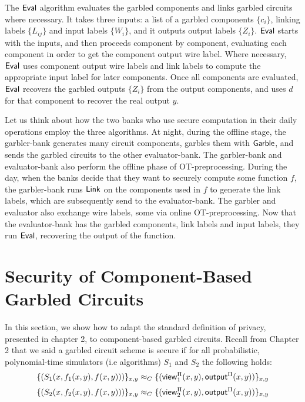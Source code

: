 The $\sf{Eval}$ algorithm evaluates the garbled components and links garbled circuits where necessary.
It takes three inputs: a list of a garbled components $\{c_i\}$, linking labels $\{L_{ij}\}$ and input labels $\{W_i\}$, and it outputs output labels $\{Z_i\}$. 
$\sf{Eval}$ starts with the inputs, and then proceeds component by component, evaluating each component in order to get the component output wire label.
Where necessary, $\sf{Eval}$ uses component output wire labels and link labels to compute the appropriate input label for later components. 
Once all components are evaluated, $\sf{Eval}$ recovers the garbled outputs $\{Z_i\}$ from the output components, and uses $d$ for that component to recover the real output $y$. 

Let us think about how the two banks who use secure computation in their daily operations employ the three algorithms.
At night, during the offline stage, the garbler-bank generates many circuit components, garbles them with $\sf{Garble}$, and sends the garbled circuits to the other evaluator-bank. 
The garbler-bank and evaluator-bank also perform the offline phase of OT-preprocessing.
During the day, when the banks decide that they want to securely compute some function $f$, the garbler-bank runs $\sf{Link}$ on the components used in $f$ to generate the link labels, which are subsequently send to the evaluator-bank.
The garbler and evaluator also exchange wire labels, some via online OT-preprocessing. 
Now that the evaluator-bank has the garbled components, link labels and input labels, they run $\sf{Eval}$, recovering the output of the function.

\section{Security of Component-Based Garbled Circuits}

In this section, we show how to adapt the standard definition of privacy, presented in chapter 2, to component-based garbled circuits.
Recall from Chapter 2 that we said a garbled circuit scheme is secure if for all probabilistic, polynomial-time simulators (i.e algorithms) $S_1$ and $S_2$ the following holds:
\begin{equation}
\label{eqn:party1}
    \{(S_1(x, f_1(x,y), f(x,y)))\}_{x,y} \approx_C \{({\sf view}^{\Pi}_1(x,y), {\sf output}^{\Pi}(x,y)) \}_{x,y}
\end{equation}
\begin{equation}
\label{eqn:party2}
    \{(S_2(x, f_2(x,y), f(x,y)))\}_{x,y} \approx_C \{({\sf view}^{\Pi}_2(x,y), {\sf output}^{\Pi}(x,y)) \}_{x,y}
\end{equation}

